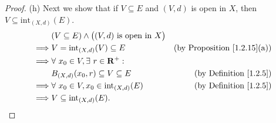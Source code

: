 \begin{proof}{(h)}
    Next we show that if \(V \subseteq E\) and \((V, d)\) is open in \(X\), then \(V \subseteq \text{int}_{(X, d)}(E)\).
    \begin{align*}
                 & (V \subseteq E) \land \big((V, d) \text{ is open in } X\big)                                           \\
        \implies & V = \text{int}_{(X, d)}(V) \subseteq E                       & \text{(by Proposition \ref{1.2.15}(a))} \\
        \implies & \forall\ x_0 \in V, \exists\ r \in \mathbf{R}^+ :                                                      \\
                 & B_{(X, d)}(x_0, r) \subseteq V \subseteq E                   & \text{(by Definition \ref{1.2.5})}      \\
        \implies & \forall\ x_0 \in V, x_0 \in \text{int}_{(X, d)}(E)           & \text{(by Definition \ref{1.2.5})}      \\
        \implies & V \subseteq \text{int}_{(X, d)}(E).
    \end{align*}


\end{proof}
